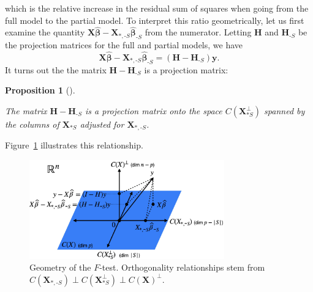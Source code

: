 \documentclass[
  11pt,
  letterpaper,
  oneside]{book}
\theoremstyle{plain}
\theoremstyle{plain}
\theoremstyle{definition}
\theoremstyle{definition}
\theoremstyle{plain}
\newtheorem{proposition}{Proposition}[chapter]
\theoremstyle{remark}
\begin{document}
which is the relative increase in the residual sum of squares when going
from the full model to the partial model. To interpret this ratio
geometrically, let us first examine the quantity
\(\boldsymbol{X} \boldsymbol{\widehat{\beta}} - \boldsymbol{X}_{*, \text{-}S} \boldsymbol{\widehat{\beta}}_{\text{-}S}\)
from the numerator. Letting \(\boldsymbol{H}\) and
\(\boldsymbol{H}_{\text{-}S}\) be the projection matrices for the full
and partial models, we have \[
\boldsymbol{X} \boldsymbol{\widehat{\beta}} - \boldsymbol{X}_{*, \text{-}S} \boldsymbol{\widehat{\beta}}_{\text{-}S} = (\boldsymbol H - \boldsymbol H_{\text{-}S}) \boldsymbol{y}.
\] It turns out the the matrix
\(\boldsymbol{H} - \boldsymbol{H}_{\text{-}S}\) is a projection matrix:

\begin{proposition}[]\protect\hypertarget{prp-f-test-geometry}{}\label{prp-f-test-geometry}

The matrix \(\boldsymbol{H} - \boldsymbol{H}_{\text{-}S}\) is a
projection matrix onto the space \(C(\boldsymbol{X}_{*S}^\perp)\)
spanned by the columns of \(\boldsymbol X_{*S}\) adjusted for
\(\boldsymbol X_{*,\text{-}S}\).

\end{proposition}

Figure~\ref{fig-f-test-geometry} illustrates this relationship.

\begin{figure}

{\centering \includegraphics[width=0.75\textwidth,height=\textheight]{figures/F-test-geometry.jpg}

}

\caption{\label{fig-f-test-geometry}Geometry of the \(F\)-test.
Orthogonality relationships stem from
\(C(\boldsymbol{X}_{*,\text{-}S}) \perp C(\boldsymbol{X}_{*S}^\perp) \perp C(\boldsymbol{X})^\perp\).}

\end{figure}
\end{document}

